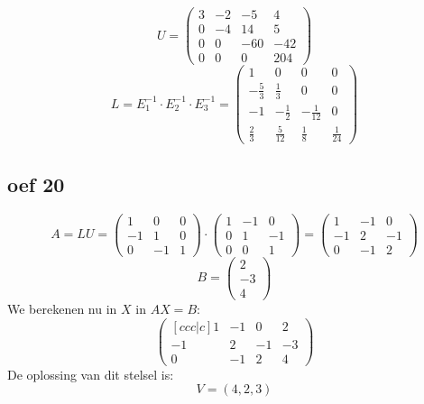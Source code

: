 \documentclass[lineaire_algebra_oplossingen.tex]{subfiles}
\begin{document}
\[ U = 
\begin{pmatrix}
3 & -2 & -5 & 4\\
0 & -4 & 14 & 5\\
0 & 0 & -60 & -42\\
0 & 0 & 0 & 204
\end{pmatrix}
\]
\[ L = E_1^{-1} \cdot E_2^{-1} \cdot E_3^{-1}
= \begin{pmatrix}
1 & 0 & 0 & 0\\
-\frac{5}{3} & \frac{1}{3} & 0 & 0\\
-1 & -\frac{1}{2} & -\frac{1}{12} & 0\\
\frac{2}{3} & \frac{5}{12} & \frac{1}{8} & \frac{1}{24}
\end{pmatrix}
\]


\subsection{oef 20}
$$ A = LU = \begin{pmatrix}
1 & 0 & 0\\
-1 & 1 & 0\\
0 & -1 & 1
\end{pmatrix}
\cdot \begin{pmatrix}
1 & -1 & 0\\
0 & 1 & -1\\
0 & 0 & 1
\end{pmatrix}
=
\begin{pmatrix}
1 & -1 & 0\\
-1 & 2 & -1\\
0 & -1 & 2
\end{pmatrix}
$$
$$B = \begin{pmatrix}
2\\
-3\\
4
\end{pmatrix}
$$
We berekenen nu in $X$ in $AX = B$:
$$
\begin{pmatrix}[ccc|c]
1 & -1 & 0 & 2\\
-1 & 2 & -1 & -3\\
0 & -1 & 2 & 4
\end{pmatrix}
$$
De oplossing van dit stelsel is:\\
$$V = {(4,2,3)}$$
\end{document}
